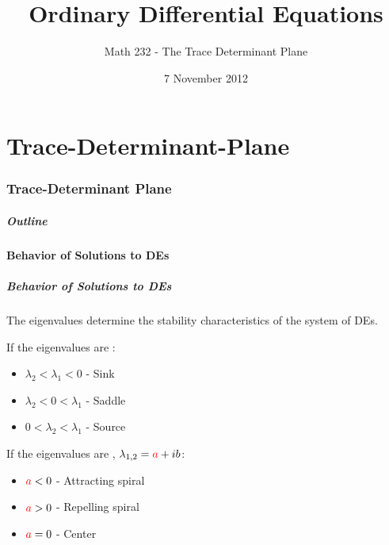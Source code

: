 \part{Trace-Determinant-Plane}
\section{Trace-Determinant Plane}


\title{Ordinary Differential Equations}
\subtitle{Math 232 - The Trace Determinant Plane}
\date{7 November 2012}

\begin{frame}
  \titlepage
\end{frame}

\begin{frame}
  \frametitle{Outline}
  \tableofcontents[ currentsection ]
\end{frame}


\subsection{Behavior of Solutions to DEs}


\begin{frame}
  \frametitle{Behavior of Solutions to DEs}

  The eigenvalues determine the stability characteristics of the
  system of DEs.

  If the eigenvalues are :
  \begin{itemize}
  \item $\lambda_2 < \lambda_1 < 0$ - Sink
  \item $\lambda_2 < 0 < \lambda_1$ - Saddle
  \item $0 < \lambda_2 < \lambda_1$ - Source
  \end{itemize}

  If the eigenvalues are , $\lambda_{1,2}={\color{red}a}+ib$:
  \begin{itemize}
  \item ${\color{red}a}<0$ - Attracting spiral
  \item ${\color{red}a}>0$ - Repelling spiral
  \item ${\color{red}a}=0$ - Center
  \end{itemize}

\end{frame}

